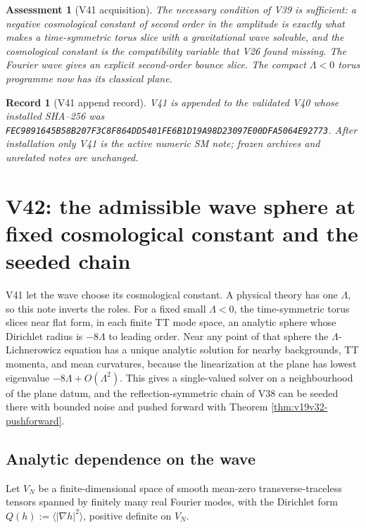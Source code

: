 \documentclass[11pt]{article}
\newtheorem{assessment}[theorem]{Assessment}
\newtheorem{record}[theorem]{Record}
\theoremstyle{remark}
\begin{document}
\begin{assessment}[V41 acquisition]
\label{ass:v19v41}
The necessary condition of V39 is sufficient: a negative cosmological
constant of second order in the amplitude is exactly what makes a
time-symmetric torus slice with a gravitational wave solvable, and the
cosmological constant is the compatibility variable that V26 found
missing.  The Fourier wave gives an explicit second-order bounce slice.
The compact \(\Lambda<0\) torus programme now has its classical plane.
\end{assessment}

\begin{record}[V41 append record]
\label{rec:v19v41}
V41 is appended to the validated V40 whose installed SHA--256 was
\texttt{FEC9891645B58B207F3C8F864DD5401FE6B1D19A98D23097E00DFA5064E92773}.
After installation only V41 is the active numeric SM note; frozen
archives and unrelated notes are unchanged.
\end{record}


\section{V42: the admissible wave sphere at fixed cosmological constant and the seeded chain}
\label{sec:v19v42}

V41 let the wave choose its cosmological constant.  A physical theory
has one \(\Lambda\), so this note inverts the roles.  For a fixed small
\(\Lambda<0\), the time-symmetric torus slices near flat form, in each
finite TT mode space, an analytic sphere whose Dirichlet radius is
\(-8\Lambda\) to leading order.  Near any point of that sphere the
\(\Lambda\)-Lichnerowicz equation has a unique analytic solution for
nearby backgrounds, TT momenta, and mean curvatures, because the
linearization at the plane has lowest eigenvalue \(-8\Lambda+O(\Lambda^2)\).
This gives a single-valued solver on a neighbourhood of the plane
datum, and the reflection-symmetric chain of V38 can be seeded there
with bounded noise and pushed forward with Theorem
\ref{thm:v19v32-pushforward}.

\subsection{Analytic dependence on the wave}

Let \(V_N\) be a finite-dimensional space of smooth mean-zero
transverse-traceless tensors spanned by finitely many real Fourier
modes, with the Dirichlet form \(Q(h):=\langle|\nabla h|^2\rangle\),
positive definite on \(V_N\).
\end{document}
